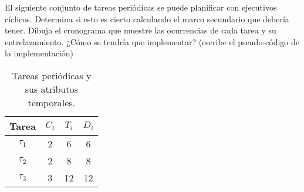 \begin{ejercicio}\label{ej:rel4_2}
    El siguiente conjunto de tareas periódicas se puede planificar con ejecutivos cíclicos. Determina si esto es cierto calculando el marco secundario que debería tener. Dibuja el cronograma que muestre las ocurrencias de cada tarea y su entrelazamiento. ¿Cómo se tendría que implementar? (escribe el pseudo-código de la implementación)
    \begin{table}[H]
    \centering
    \begin{tabular}{|c|c|c|c|}
        \hline
        Tarea & $C_i$ & $T_i$ & $D_i$ \\
        \hline
        $\tau_1$ & 2 & 6 & 6 \\
        \hline
        $\tau_2$ & 2 & 8 & 8 \\
        \hline
        $\tau_3$ & 3 & 12 & 12 \\
        \hline
    \end{tabular}
    \caption{Tareas periódicas y sus atributos temporales.}
    \label{tab:4_2}
    \end{table}


\end{ejercicio}
